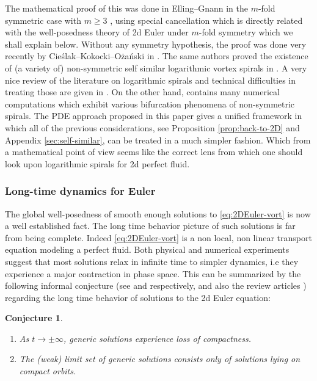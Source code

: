 \documentclass[10pt]{amsart}
\theoremstyle{plain}
\newtheorem{conjecture}[theorem]{Conjecture}
\theoremstyle{definition}
\begin{document}
The mathematical proof of this was done in Elling--Gnann in the $m$-fold symmetric case with $m\ge3$ \cite{Elling-Gnann}, using special cancellation which is directly related with the well-posedness theory of 2d Euler under $m$-fold symmetry which we shall explain below. Without any symmetry hypothesis, the proof was done very recently by Cie{\'s}lak--Kokocki--O{\.z}a{\'n}ski in \cite{CKW21}. The same authors proved the existence of (a variety of) non-symmetric self similar logarithmic vortex spirals in \cite{CKW22}. A very nice review of the literature on logarithmic spirals and technical difficulties in treating those are given in \cite{CKW21,CKW22}. On the other hand, \cite{Elling-Gnann} contains many numerical computations which exhibit various bifurcation phenomena of non-symmetric spirals. The PDE approach proposed in this paper gives a unified framework in which all of the previous considerations, see Proposition \ref{prop:back-to-2D} and Appendix \ref{sec:self-similar}, can be treated in a much simpler fashion. Which from a mathematical point of view seems like the correct lens from which one should look upon logarithmic spirals for 2d perfect fluid.

\subsubsection*{Long-time dynamics for Euler}
The global well-posedness of smooth enough solutions to \eqref{eq:2DEuler-vort} is now a well established fact. The long time behavior picture of such solutions is far from being complete. Indeed \eqref{eq:2DEuler-vort} is a non local, non linear transport equation modeling a perfect fluid. Both physical and numerical experiments suggest that most solutions relax in infinite time to simpler dynamics, i.e they experience a major contraction in phase space. This can be summarized by the following informal conjecture (see \cite{Sverakcours} and \cite{Shnirelman} respectively, \cite{EMS} and also the review articles \cite{ED-review,Shnirelman-turvey}) regarding the long time behavior of solutions to the 2d Euler equation:

\skpt
\begin{conjecture}\label{conj:losscompactnessandcompactorbits}
\begin{enumerate}
\item As $t\to\pm\infty$, generic solutions experience loss of compactness.
\item The (weak) limit set of generic solutions consists only of solutions lying on compact orbits.
\end{enumerate}
\end{conjecture}
\end{document}

